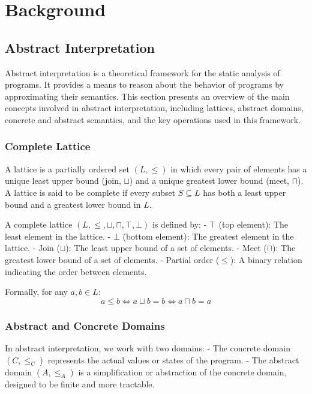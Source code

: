 \chapter{Background}

\section{Abstract Interpretation}

Abstract interpretation is a theoretical framework for the static analysis of programs. It provides a means to reason about the behavior of programs by approximating their semantics. This section presents an overview of the main concepts involved in abstract interpretation, including lattices, abstract domains, concrete and abstract semantics, and the key operations used in this framework.

\subsection{Complete Lattice}

A lattice is a partially ordered set \((L, \leq)\) in which every pair of elements has a unique least upper bound (join, \(\sqcup\)) and a unique greatest lower bound (meet, \(\sqcap\)). A lattice is said to be complete if every subset \(S \subseteq L\) has both a least upper bound and a greatest lower bound in \(L\).

A complete lattice \((L, \leq, \sqcup, \sqcap, \top, \bot)\) is defined by:
- \(\top\) (top element): The least element in the lattice.
- \(\bot\) (bottom element): The greatest element in the lattice.
- Join (\(\sqcup\)): The least upper bound of a set of elements.
- Meet (\(\sqcap\)): The greatest lower bound of a set of elements.
- Partial order (\(\leq\)): A binary relation indicating the order between elements.

Formally, for any \(a, b \in L\):
\[ a \leq b \Leftrightarrow a \sqcup b = b \Leftrightarrow a \sqcap b = a \]

\subsection{Abstract and Concrete Domains}

In abstract interpretation, we work with two domains:
- The concrete domain \((C, \leq_C)\) represents the actual values or states of the program.
- The abstract domain \((A, \leq_A)\) is a simplification or abstraction of the concrete domain, designed to be finite and more tractable.

